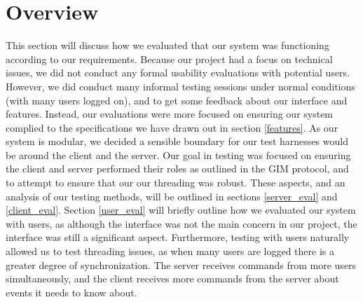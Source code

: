 \section{Overview}

This section will discuss how we evaluated that our system was functioning according to our requirements. Because our project had a focus on technical issues, we did not conduct any formal usability evaluations with potential users. However, we did conduct many informal testing sessions under normal conditions (with many users logged on), and to get some feedback about our interface and features. Instead, our evaluations were more focused on ensuring our system complied to the specifications we have drawn out in section \ref{features}. As our system is modular, we decided a sensible boundary for our test harnesses would be around the client and the server. Our goal in testing was focused on ensuring the client and server performed their roles as outlined in the GIM protocol, and to attempt to ensure that our our threading was robust.  These aspects, and an analysis of our testing methods, will be outlined in sections \ref{server_eval} and \ref{client_eval}. Section \ref{user_eval} will briefly outline how we evaluated our system with users, as although the interface was not the main concern in our project, the interface was still a significant aspect. Furthermore, testing with users naturally allowed us to test threading issues, as when many users are logged there is a greater degree of synchronization. The server receives commands from more users simultaneously, and the client receives more commands from the server about events it needs to know about.
